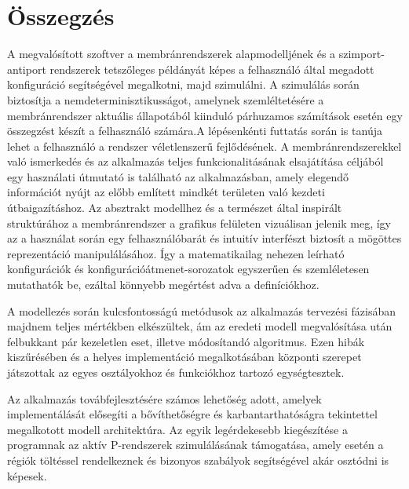 \chapter{Összegzés}
\label{ch:sum}
A megvalósított szoftver a membránrendszerek alapmodelljének és a szimport-antiport rendszerek tetszőleges példányát képes a felhasználó által megadott konfiguráció segítségével megalkotni, majd szimulálni.  A szimulálás során biztosítja a nemdeterminisztikusságot, amelynek szemléltetésére a membránrendszer aktuális állapotából kiinduló párhuzamos számítások esetén egy összegzést készít a felhasználó számára.A lépésenkénti futtatás során is tanúja lehet a felhasználó a rendszer véletlenszerű fejlődésének.
A membránrendszerekkel való ismerkedés és az alkalmazás teljes funkcionalitásának elsajátítása céljából egy használati útmutató is található az alkalmazásban, amely elegendő információt nyújt az előbb említett mindkét területen való kezdeti útbaigazításhoz. Az absztrakt modellhez és a természet által inspirált struktúrához a membránrendszer a grafikus felületen vizuálisan jelenik meg, így az a használat során egy felhasználóbarát és intuitív interfészt biztosít a mögöttes reprezentáció manipulálásához. Így a matematikailag nehezen leírható konfigurációk és konfigurációátmenet-sorozatok egyszerűen és szemléletesen mutathatók be, ezáltal könnyebb megértést adva a definíciókhoz.

A modellezés során kulcsfontosságú metódusok az alkalmazás tervezési fázisában majdnem teljes mértékben elkészültek, ám az eredeti modell megvalósítása után felbukkant pár kezeletlen eset, illetve  módosítandó algoritmus. Ezen hibák kiszűrésében és a helyes implementáció megalkotásában központi szerepet játszottak az egyes osztályokhoz és funkciókhoz tartozó egységtesztek.

Az alkalmazás továbfejlesztésére számos lehetőség adott, amelyek implementálását elősegíti a bővíthetőségre és karbantarthatóságra tekintettel megalkotott modell architektúra. Az egyik legérdekesebb kiegészítése a programnak az aktív P-rendszerek szimulálásának támogatása, amely esetén a régiók töltéssel rendelkeznek és bizonyos szabályok segítségével akár osztódni is képesek.